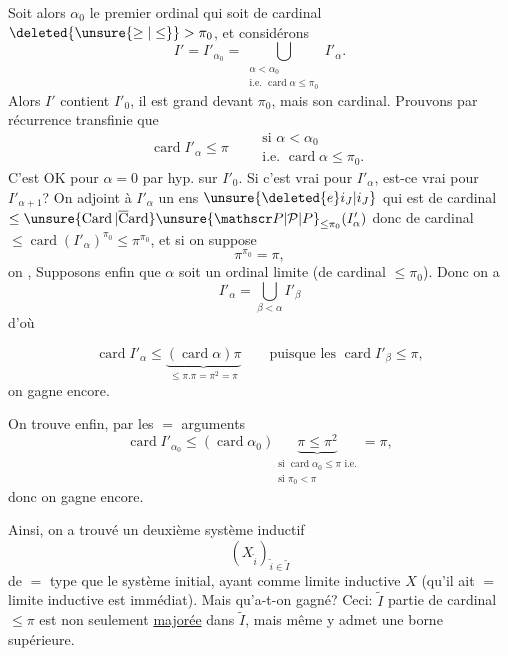 Soit alors $\alpha_0$ le premier ordinal qui soit de cardinal $\deleted{\unsure{\geq|\leq}}>\pi_0$, et considérons 
\[
I'=I'_{\alpha_0}=\bigcup_{\substack{\alpha<\alpha_0\\\text{i.e. }\operatorname{card}\alpha\leq\pi_0}}I'_\alpha.
\]
Alors $I'$ contient $I'_0$, il est grand devant $\pi_0$, mais  son cardinal. Prouvons par récurrence transfinie que
\[
\operatorname{card}I'_\alpha\leq\pi\qquad
\begin{gathered}
\text{si }\alpha<\alpha_0\\
\text{i.e. }\operatorname{card}\alpha\leq\pi_0.
\end{gathered}
\]
C'est OK pour $\alpha=0$ par hyp. sur $I'_0$. Si c'est vrai pour $I'_\alpha$, est-ce vrai pour $I'_{\alpha+1}$? On  adjoint à $I'_\alpha$ un ens  $\unsure{\deleted{e}i_J|i_J}$ qui est de cardinal $\leq\unsure{\operatorname{Card}|\overline{\mathrm C}\mathrm{ard}}\unsure{\mathscr P|\mathcal P|P}_{\leq\pi_0}(I'_\alpha)$ donc de cardinal $\leq\operatorname{card}(I'_\alpha)^{\pi_0}\leq\pi^{\pi_0}$, et si on suppose
\[
\pi^{\pi_0}=\pi,
\]
on ,  Supposons enfin que $\alpha$ soit un ordinal limite (de cardinal $\leq\pi_0$). Donc on a
\[
I'_\alpha=\bigcup_{\beta<\alpha}I'_\beta
\]
d'où 

\[
\operatorname{card}I'_\alpha\leq
\underbrace{(\operatorname{card}\alpha)\pi}_{\leq\pi.\pi=\pi^2=\pi}
\qquad\text{puisque les }\operatorname{card}I'_\beta\leq\pi,
\]
on gagne encore.

On trouve enfin, par les $=$ arguments
\[
\operatorname{card}I'_{\alpha_0}\leq(\operatorname{card}\alpha_0)
\underbrace{\pi\leq\pi^2}_{\substack{\text{si }\operatorname{card}\alpha_0\leq\pi\text{ i.e.}\\\text{si }\pi_0<\pi}}=\pi,
\]
donc on gagne encore.

Ainsi, on a trouvé un deuxième système inductif
\[
(X_{\widetilde i})_{\widetilde i\in\widetilde I}
\]
de $=$ type que le système initial, ayant comme limite inductive $X$ (qu'il ait $=$ limite inductive est immédiat). Mais qu'a-t-on gagné? Ceci:   $\widetilde I$   partie  de cardinal $\leq\pi$ est non seulement \uline{majorée} dans $\widetilde I$, mais même y admet une borne supérieure.
\margin{$\Vert$}


